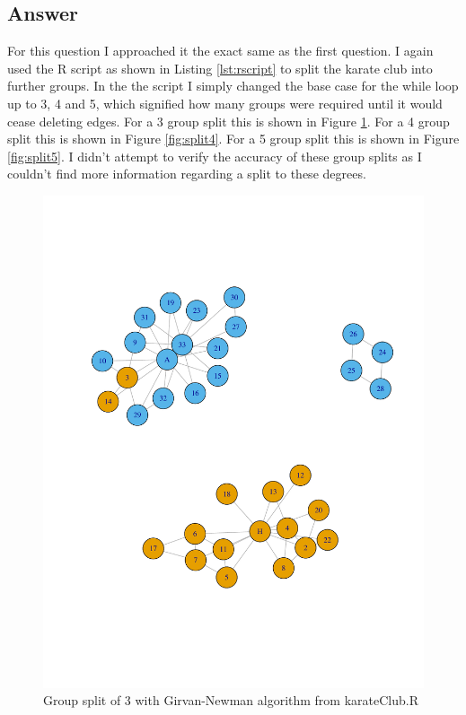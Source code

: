 \documentclass[letterpaper,11pt]{article}
\begin{document}
\clearpage
\subsection*{Answer}

For this question I approached it the exact same as the first question. I again used the R script as shown in Listing \ref{lst:rscript} to split the karate club into further groups. In the the script I simply changed the base case for the while loop up to 3, 4 and 5, which signified how many groups were required until it would cease deleting edges. For a 3 group split this is shown in Figure \ref{fig:split3}. For a 4 group split this is shown in Figure \ref{fig:split4}. For a 5 group split this is shown in Figure \ref{fig:split5}. I didn't attempt to verify the accuracy of these group splits as I couldn't find more information regarding a split to these degrees.

\begin{figure}[h]
\centering
\includegraphics[scale=0.6]{predictedSplit3.pdf}
\caption{Group split of 3 with Girvan-Newman algorithm from karateClub.R}
\label{fig:split3}
\end{figure}
\end{document}
